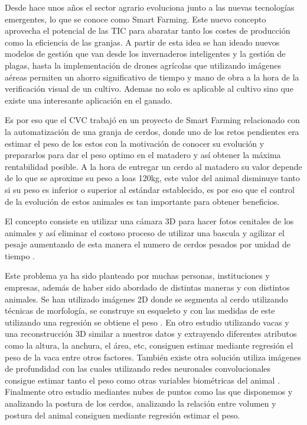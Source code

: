 \documentclass[12pt,a4paper]{article}
\begin{document}
Desde hace unos años el sector agrario evoluciona junto a las nuevas tecnologías emergentes, lo que se conoce como Smart Farming. Este nuevo concepto aprovecha el potencial de las TIC para abaratar tanto los costes de producción como la eficiencia de las granjas. A partir de esta idea se han ideado nuevos modelos de gestión que van desde los invernaderos inteligentes y la gestión de plagas, hasta la implementación de drones agrícolas que utilizando imágenes aéreas permiten un ahorro significativo de tiempo y mano de obra a la hora de la verificación visual de un cultivo. Ademas no solo es aplicable al cultivo sino que existe una interesante aplicación en el ganado. 



Es por eso que el CVC trabajó en un proyecto de Smart Farming relacionado con la automatización de una granja de cerdos, donde uno de los retos pendientes era estimar el peso de los estos con la motivación de conocer su evolución y prepararlos para dar el peso optimo en el matadero y así obtener la máxima rentabilidad posible. A la hora de entregar un cerdo al matadero su valor depende de lo que se aproxime su peso a loas 120kg, este valor del animal disminuye tanto si su peso es inferior o superior al estándar establecido, es por eso que el control de la evolución de estos animales es tan importante para obtener beneficios. 


El concepto consiste en utilizar una cámara 3D para hacer fotos cenitales de los animales y así eliminar el costoso proceso de utilizar una bascula y agilizar el pesaje aumentando de esta manera el numero de cerdos pesados por unidad de tiempo \cite{sistema}.

Este problema ya ha sido planteado por muchas personas, instituciones y empresas, además de haber sido abordado de distintas maneras y con distintos animales. Se han utilizado imágenes 2D donde se segmenta al cerdo utilizando técnicas de morfología, se construye su esqueleto y con las medidas de este utilizando una regresión se obtiene el peso \cite{Area}. En otro estudio utilizando vacas y una reconstrucción 3D similar a nuestros datos y extrayendo diferentes atributos como la altura, la anchura, el área, etc, consiguen estimar mediante regresión el peso de la vaca entre otros factores\cite{3D}.
También existe otra solución utiliza imágenes de profundidad con las cuales utilizando redes neuronales convolucionales consigue estimar tanto el peso como otras variables biométricas del animal \cite{CNN}.
Finalmente otro estudio mediantes nubes de puntos como las que disponemos y analizando la postura de los cerdos, analizando la relación entre volumen y postura del animal consiguen mediante regresión estimar el peso.
\end{document}
